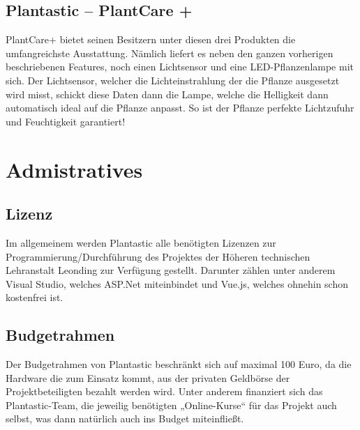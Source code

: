 \documentclass[12pt]{article}
\theoremstyle{definition}
\begin{document}
\subsection{Plantastic – PlantCare +}

PlantCare+ bietet seinen Besitzern unter diesen drei Produkten die umfangreichste Ausstattung. Nämlich liefert es neben den ganzen vorherigen beschriebenen Features, noch einen Lichtsensor und eine LED-Pflanzenlampe mit sich. Der Lichtsensor, welcher die Lichteinstrahlung der die Pflanze ausgesetzt wird misst, schickt diese Daten dann die Lampe, welche die Helligkeit dann automatisch ideal auf die Pflanze anpasst. So ist der Pflanze perfekte Lichtzufuhr und Feuchtigkeit garantiert!


\pagebreak

\section{Admistratives}

\subsection{Lizenz}
Im allgemeinem werden Plantastic alle benötigten Lizenzen zur Programmierung/Durchführung des Projektes der Höheren technischen Lehranstalt Leonding zur Verfügung gestellt. Darunter zählen unter anderem Visual Studio, welches ASP.Net miteinbindet und Vue.js, welches ohnehin schon kostenfrei ist.

\subsection{Budgetrahmen}
Der Budgetrahmen von Plantastic beschränkt sich auf maximal 100 Euro, da die Hardware die zum Einsatz kommt, aus der privaten Geldbörse der Projektbeteiligten bezahlt werden wird. Unter anderem finanziert sich das Plantastic-Team, die jeweilig benötigten „Online-Kurse“ für das Projekt auch selbst, was dann natürlich auch ins Budget miteinfließt.
\end{document}

